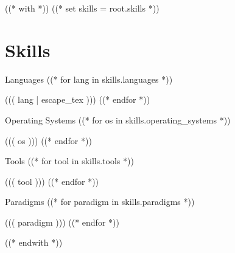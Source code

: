 ((* with *))
((* set skills = root.skills *))
\section{Skills}\relax
    \vspace{-2em} %
    \begin{multicols}{2}
        \begin{csitemize}{Languages}
        ((* for lang in skills.languages *))
            \item ((( lang | escape_tex )))
        ((* endfor *))
        \end{csitemize}

        \begin{csitemize}{Operating Systems}
        ((* for os in skills.operating_systems *))
            \item ((( os )))
        ((* endfor *))
        \end{csitemize}

        \begin{csitemize}{Tools}
        ((* for tool in skills.tools *))
            \item ((( tool )))
        ((* endfor *))
        \end{csitemize}

        \begin{csitemize}{Paradigms}
        ((* for paradigm in skills.paradigms *))
            \item ((( paradigm )))
        ((* endfor *))
        \end{csitemize}
    \end{multicols}
((* endwith *))
